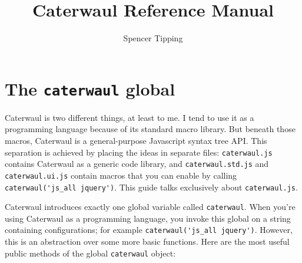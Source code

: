\documentclass{report}
\title{Caterwaul Reference Manual}
\author{Spencer Tipping}
\begin{document}
\maketitle{}
\tableofcontents{}

\chapter{The {\tt caterwaul} global}
  Caterwaul is two different things, at least to me. I tend to use it as a programming language because of its standard macro library. But beneath those macros, Caterwaul is a general-purpose
  Javascript syntax tree API. This separation is achieved by placing the ideas in separate files: {\tt caterwaul.js} contains Caterwaul as a generic code library, and {\tt caterwaul.std.js}
  and {\tt caterwaul.ui.js} contain macros that you can enable by calling \verb|caterwaul('js_all jquery')|. This guide talks exclusively about {\tt caterwaul.js}.

  Caterwaul introduces exactly one global variable called {\tt caterwaul}. When you're using Caterwaul as a programming language, you invoke this global on a string containing configurations;
  for example \verb|caterwaul('js_all jquery')|. However, this is an abstraction over some more basic functions. Here are the most useful public methods of the global {\tt caterwaul} object:
\end{document}
